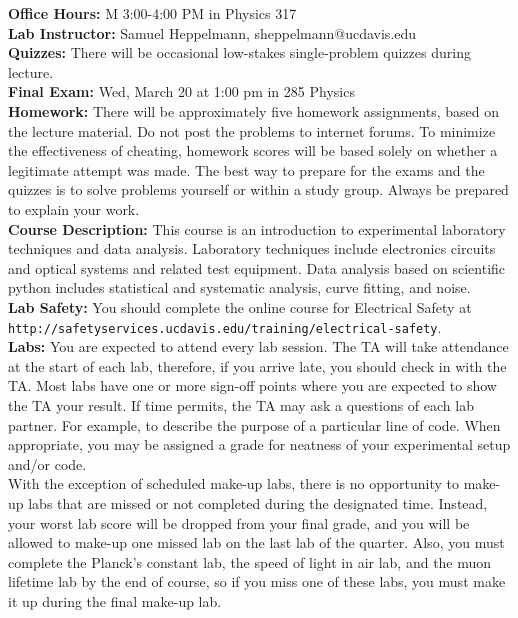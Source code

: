 \documentclass[12pt]{article}
\begin{document}
\noindent
\textbf{Office Hours:} M 3:00-4:00 PM in Physics 317 \\

\noindent
\textbf{Lab Instructor:} Samuel Heppelmann, sheppelmann@ucdavis.edu \\

\noindent
\textbf{Quizzes:}  There will be occasional low-stakes single-problem quizzes during lecture.\\

\noindent
\textbf{Final Exam:} Wed, March 20 at 1:00 pm in 285 Physics \\

\noindent
\textbf{Homework:} There will be approximately five homework
assignments, based on the lecture material.  Do not post the problems
to internet forums.  To minimize the effectiveness of cheating,
homework scores will be based solely on whether a legitimate attempt
was made.  The best way to prepare for the exams and the quizzes is to
solve problems yourself or within a study group.  Always be prepared
to explain your work.\\

\noindent
\textbf {Course Description:}  This course is an introduction to experimental laboratory techniques and data analysis.  Laboratory techniques include electronics circuits and optical systems and related test equipment.  Data analysis based on scientific python includes statistical and systematic analysis, curve fitting, and noise.\\

\noindent
\textbf {Lab Safety:} 
You should complete the online course for Electrical Safety at \\
{\tt http://safetyservices.ucdavis.edu/training/electrical-safety}.\\


\noindent
\textbf {Labs:} 
You are expected to attend every lab session.  The TA will take attendance at the start of each lab, therefore, if you arrive late, you should check in with the TA.   Most labs have one or more sign-off points where you are expected to show the TA your result.  If time permits, the TA may ask a questions of each lab partner.  For example, to describe the purpose of a particular line of code.  When appropriate, you may be assigned a grade for neatness of your experimental setup and/or code.\\

With the exception of scheduled make-up labs, there is no opportunity to make-up labs that are missed or not completed during the designated time.  Instead, your worst lab score will be dropped from your final grade, and you will be allowed to make-up one missed lab on the last lab of the quarter.  Also, you must complete the Planck's constant lab, the speed of light in air lab, and the muon lifetime lab by the end of course, so if you miss one of these labs, you must make it up during the final make-up lab.
\end{document}
